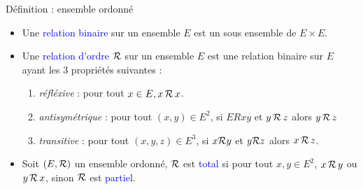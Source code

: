 \documentclass[10pt]{beamer}
\begin{document}
\begin{frame}[fragile]{\Ctitle}{\stitle}
	\begin{alertblock}{Définition : ensemble ordonné}
		\begin{itemize}
			\item<1-> Une \textcolor{blue}{relation binaire} sur un ensemble $E$ est un sous ensemble de $E \times E$.
			\item<2-> Une \textcolor{blue}{relation d'ordre} $\mathcal{R}$ sur un ensemble $E$ est une relation binaire sur $E$ ayant les 3 propriétés suivantes :
				\begin{enumerate}
					\item<3-> \textit{réfléxive} : pour tout $x \in E, x \, \mathcal{R}\, x$.
					\item<4-> \textit{antisymétrique} : pour tout $(x,y) \in E^2$, si $ER{x}{y}$ et $y \, \mathcal{R}\, z$ alors $y \, \mathcal{R}\, z$
					\item<5-> \textit{transitive} : pour tout $(x,y,z) \in E^3$, si $x \mathcal{R} y$ et $y \mathcal{R} z$ alors $x \, \mathcal{R}\, z$.
				\end{enumerate}
			\item<7-> Soit $(E,\mathcal{R})$ un ensemble ordonné,  $\mathcal{R}$ est  \textcolor{blue}{total} si pour tout $x,y \in E^2$, $x \, \mathcal{R}\, y$ ou $y \, \mathcal{R}\, x$, sinon $\mathcal{R}$ est \textcolor{blue}{partiel}.
		\end{itemize}
	\end{alertblock}
\end{frame}
\end{document}
